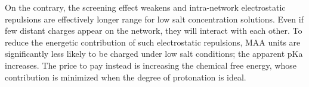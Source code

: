 On the contrary, the screening effect weakens and intra-network electrostatic repulsions are effectively longer range for low salt concentration solutions.
Even if few distant charges appear on the network, they will interact with each other.
To reduce the energetic contribution of such electrostatic repulsions, MAA units are significantly less likely to be charged under low salt conditions;
the apparent pKa increases.
The price to pay instead is increasing the chemical free energy, whose contribution is minimized when the degree of protonation is ideal.
